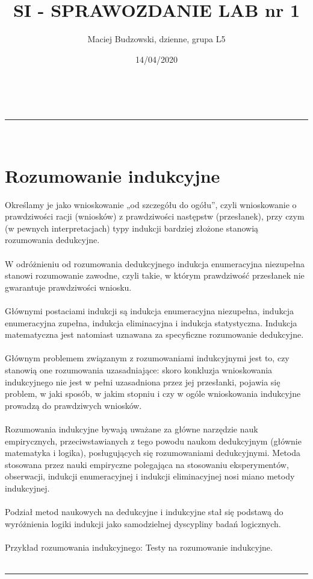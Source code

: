 \documentclass[a4paper,12pt]{article}
\makeatletter
\newcommand{\linia}{\rule{\linewidth}{0.5pt}}
\theoremstyle{mytheor}
\renewcommand{\maketitle}{
\begin{center}
\vspace{2ex}
{\huge \textsc{\@title}}
\vspace{1ex}
\\
\linia\\
\@author \hfill \@date
\vspace{4ex}
\end{center}
}
\makeatother
\begin{document}
\title{SI - SPRAWOZDANIE LAB nr 1}

\author{Maciej Budzowski, dzienne, grupa L5}

\date{14/04/2020}

\maketitle

\section*{Rozumowanie indukcyjne}
Określamy je jako wnioskowanie „od szczegółu do ogółu”, czyli wnioskowanie o prawdziwości racji (wniosków) z prawdziwości następstw (przesłanek), przy czym (w pewnych interpretacjach) typy indukcji bardziej złożone stanowią rozumowania dedukcyjne.
\\\\
W odróżnieniu od rozumowania dedukcyjnego indukcja enumeracyjna niezupełna stanowi rozumowanie zawodne, czyli takie, w którym prawdziwość przesłanek nie gwarantuje prawdziwości wniosku.
\\\\
Głównymi postaciami indukcji są indukcja enumeracyjna niezupełna, indukcja enumeracyjna zupełna, indukcja eliminacyjna i indukcja statystyczna. Indukcja matematyczna jest natomiast uznawana za specyficzne rozumowanie dedukcyjne.
\\\\
Głównym problemem związanym z rozumowaniami indukcyjnymi jest to, czy stanowią one rozumowania uzasadniające: skoro konkluzja wnioskowania indukcyjnego nie jest w pełni uzasadniona przez jej przesłanki, pojawia się problem, w jaki sposób, w jakim stopniu i czy w ogóle wnioskowania indukcyjne prowadzą do prawdziwych wniosków. 
\\\\
Rozumowania indukcyjne bywają uważane za główne narzędzie nauk empirycznych, przeciwstawianych z tego powodu naukom dedukcyjnym (głównie matematyka i logika), posługujących się rozumowaniami dedukcyjnymi. Metoda stosowana przez nauki empiryczne polegająca na stosowaniu eksperymentów, obserwacji, indukcji enumeracyjnej i indukcji eliminacyjnej nosi miano metody indukcyjnej.
\\\\
Podział metod naukowych na dedukcyjne i indukcyjne stał się podstawą do wyróżnienia logiki indukcji jako samodzielnej dyscypliny badań logicznych. 
\\\\
Przykład rozumowania indukcyjnego: Testy na rozumowanie indukcyjne.
\\\\\linia\\
\end{document}
